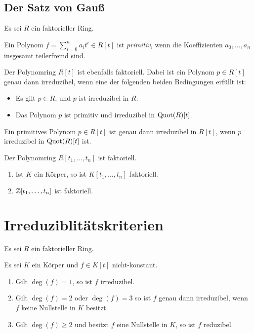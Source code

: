 \subsection{Der Satz von Gauß}

Es sei $R$ ein faktorieller Ring.

\begin{definition}
  Ein Polynom $f = \sum_{i=0}^n a_i t^i \in R[t]$ ist \emph{primitiv}, wenn die Koeffizienten $a_0, \dotsc, a_n$ insgesamt teilerfremd sind.
\end{definition}

\begin{theorem}
  Der Polynomring $R[t]$ ist ebenfalls faktoriell.
  Dabei ist ein Polynom $p \in R[t]$ genau dann irreduzibel, wenn eine der folgenden beiden Bedingungen erfüllt ist:
  \begin{itemize}
    \item
      Es gilt $p \in R$, und $p$ ist irreduzibel in $R$.
    \item
      Das Polynom $p$ ist primitiv und irreduzibel in $\operatorname{Quot}(R)[t]$.
  \end{itemize}
  Ein primitives Polynom $p \in R[t]$ ist genau dann irreduzibel in $R[t]$, wenn $p$ irreduzibel in $\operatorname{Quot}(R)[t]$ ist.
\end{theorem}

\begin{corollary}
  Der Polynomring $R[t_1, \dotsc, t_n]$ ist faktoriell.
\end{corollary}

\begin{example}
  \begin{enumerate}
    \item
      Ist $K$ ein Körper, so ist $K[t_1, \dotsc, t_n]$ faktoriell.
    \item
      $\mathbb{Z}[t_1, \dotsc, t_n]$ ist faktoriell.
  \end{enumerate}
\end{example}





\section{Irreduziblitätskriterien}

Es sei $R$ ein faktorieller Ring.

\begin{lemma}
  Es sei $K$ ein Körper und $f \in K[t]$ nicht-konstant.
  \begin{enumerate}
    \item
      Gilt $\deg(f) = 1$, so ist $f$ irreduzibel.
    \item
      Gilt $\deg(f) = 2$ oder $\deg(f) = 3$ so ist $f$ genau dann irreduzibel, wenn $f$ keine Nullstelle in $K$ besitzt.
    \item
      Gilt $\deg(f) \geq 2$ und besitzt $f$ eine Nullstelle in $K$, so ist $f$ reduzibel.
  \end{enumerate}
\end{lemma}

